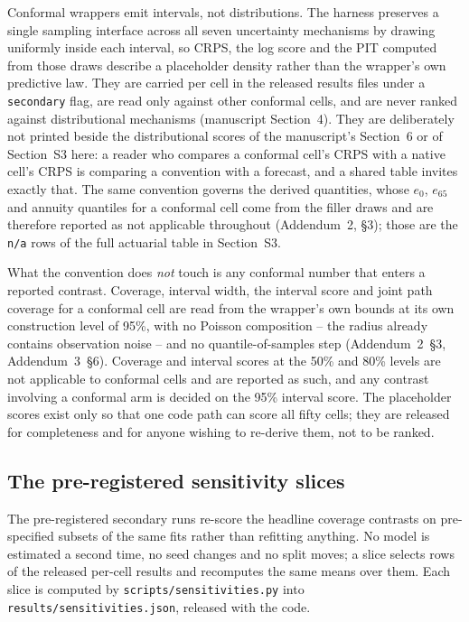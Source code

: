 Conformal wrappers emit intervals, not distributions. The harness preserves a
single sampling interface across all seven uncertainty mechanisms by drawing
uniformly inside each interval, so CRPS, the log score and the PIT computed
from those draws describe a placeholder density rather than the wrapper's own
predictive law. They are carried per cell in the released results files under a
\texttt{secondary} flag, are read only against other conformal cells, and are
never ranked against distributional mechanisms (manuscript Section~4). They are
deliberately not printed beside the distributional scores of the manuscript's
Section~6 or of Section~S3 here: a reader who compares a conformal cell's CRPS
with a native cell's CRPS is comparing a convention with a forecast, and a
shared table invites exactly that. The same convention governs the derived
quantities, whose $e_0$, $e_{65}$ and annuity quantiles for a conformal cell
come from the filler draws and are therefore reported as not applicable
throughout (Addendum~2, \S3); those are the \texttt{n/a} rows of the full
actuarial table in Section~S3.

What the convention does \emph{not} touch is any conformal number that enters a
reported contrast. Coverage, interval width, the interval score and joint path
coverage for a conformal cell are read from the wrapper's own bounds at its own
construction level of 95\%, with no Poisson composition -- the radius already
contains observation noise -- and no quantile-of-samples step (Addendum~2~\S3,
Addendum~3~\S6). Coverage and interval scores at the 50\% and 80\% levels are
not applicable to conformal cells and are reported as such, and any contrast
involving a conformal arm is decided on the 95\% interval score. The placeholder
scores exist only so that one code path can score all fifty cells; they are
released for completeness and for anyone wishing to re-derive them, not to be
ranked.

\subsection{The pre-registered sensitivity slices}
\label{supp:robustness-slices}

The pre-registered secondary runs re-score the headline coverage contrasts on
pre-specified subsets of the same fits rather than refitting anything. No model
is estimated a second time, no seed changes and no split moves; a slice selects
rows of the released per-cell results and recomputes the same means over them.
Each slice is computed by \texttt{scripts/sensitivities.py} into
\texttt{results/sensitivities.json}, released with the code.

